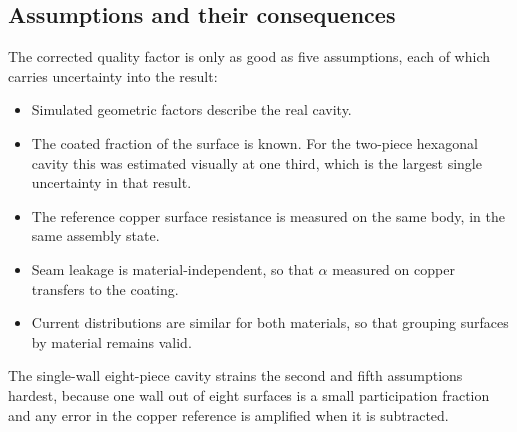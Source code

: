 \subsection{Assumptions and their consequences}

The corrected quality factor is only as good as five assumptions, each of which carries uncertainty into the result:

\begin{itemize}
    \item Simulated geometric factors describe the real cavity.
    \item The coated fraction of the surface is known. For the two-piece hexagonal cavity this was estimated visually at one third, which is the largest single uncertainty in that result.
    \item The reference copper surface resistance is measured on the same body, in the same assembly state.
    \item Seam leakage is material-independent, so that $\alpha$ measured on copper transfers to the coating.
    \item Current distributions are similar for both materials, so that grouping surfaces by material remains valid.
\end{itemize}

The single-wall eight-piece cavity strains the second and fifth assumptions hardest, because one wall out of eight surfaces is a small participation fraction and any error in the copper reference is amplified when it is subtracted.
